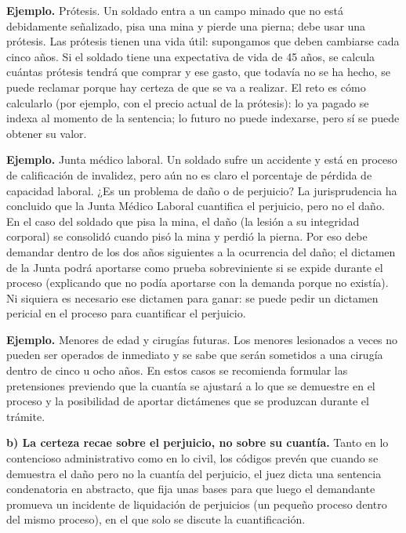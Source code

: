 \begin{ejemplo}
\textcolor[HTML]{4F6228}{\textbf{Ejemplo. }}Prótesis. Un soldado entra a un campo minado que no está debidamente señalizado, pisa una mina y pierde una pierna; debe usar una prótesis. Las prótesis tienen una vida útil: supongamos que deben cambiarse cada cinco años. Si el soldado tiene una expectativa de vida de 45 años, se calcula cuántas prótesis tendrá que comprar y ese gasto, que todavía no se ha hecho, se puede reclamar porque hay certeza de que se va a realizar. El reto es cómo calcularlo (por ejemplo, con el precio actual de la prótesis): lo ya pagado se indexa al momento de la sentencia; lo futuro no puede indexarse, pero sí se puede obtener su valor.
\par
\textcolor[HTML]{4F6228}{\textbf{Ejemplo. }}Junta médico laboral. Un soldado sufre un accidente y está en proceso de calificación de invalidez, pero aún no es claro el porcentaje de pérdida de capacidad laboral. ¿Es un problema de daño o de perjuicio? La jurisprudencia ha concluido que la Junta Médico Laboral cuantifica el perjuicio, pero no el daño. En el caso del soldado que pisa la mina, el daño (la lesión a su integridad corporal) se consolidó cuando pisó la mina y perdió la pierna. Por eso debe demandar dentro de los dos años siguientes a la ocurrencia del daño; el dictamen de la Junta podrá aportarse como prueba sobreviniente si se expide durante el proceso (explicando que no podía aportarse con la demanda porque no existía). Ni siquiera es necesario ese dictamen para ganar: se puede pedir un dictamen pericial en el proceso para cuantificar el perjuicio.
\par
\textcolor[HTML]{4F6228}{\textbf{Ejemplo. }}Menores de edad y cirugías futuras. Los menores lesionados a veces no pueden ser operados de inmediato y se sabe que serán sometidos a una cirugía dentro de cinco u ocho años. En estos casos se recomienda formular las pretensiones previendo que la cuantía se ajustará a lo que se demuestre en el proceso y la posibilidad de aportar dictámenes que se produzcan durante el trámite.
\end{ejemplo}
\textbf{b) La certeza recae sobre el perjuicio, no sobre su cuantía.} Tanto en lo contencioso administrativo como en lo civil, los códigos prevén que cuando se demuestra el daño pero no la cuantía del perjuicio, el juez dicta una sentencia condenatoria en abstracto, que fija unas bases para que luego el demandante promueva un incidente de liquidación de perjuicios (un pequeño proceso dentro del mismo proceso), en el que solo se discute la cuantificación.

